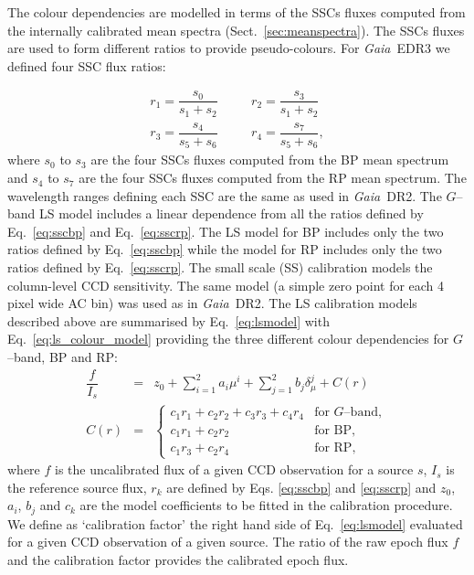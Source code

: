 \documentclass{aa}
\newcommand{\gaia}{\textit{Gaia}\xspace}
\newcommand{\gband}{$G$--band\xspace}
\newcommand{\drt}{\gaia~DR2\xspace}
\newcommand{\edr}{\gaia~EDR3\xspace}
\newcommand{\secname}{Sect.}
\newcommand{\equref}[1]{Eq.~\ref{eq:#1}}
\newcommand{\secref}[1]{\secname~\ref{sec:#1}}
\begin{document}
The colour dependencies are modelled in terms of the SSCs fluxes computed from the internally calibrated mean spectra (\secref{meanspectra}). The SSCs fluxes are used to form different ratios to provide pseudo-colours. For \edr we defined four SSC flux ratios:

\begin{eqnarray}
r_1=\dfrac{s_0}{s_1+s_2}&\quad& r_2=\dfrac{s_3}{s_1+s_2}\label{eq:sscbp}\\
r_3=\dfrac{s_4}{s_5+s_6}&\quad& r_4=\dfrac{s_7}{s_5+s_6},\label{eq:sscrp}
\end{eqnarray}
%
where $s_0$ to $s_3$ are the four SSCs fluxes computed from the BP mean spectrum and $s_4$ to $s_7$ are the four SSCs fluxes computed from the RP mean spectrum. The wavelength ranges defining each SSC are the same as used in \drt \citep[see Table 5 in][]{PhotCore}. The \gband LS model includes a linear dependence from all the ratios defined by \equref{sscbp} and \equref{sscrp}. The LS model for BP includes only the two ratios defined by \equref{sscbp} while the model for RP includes only the two ratios defined by \equref{sscrp}.
The small scale (SS) calibration models the column-level CCD sensitivity. The same model (a simple zero point for each 4 pixel wide AC bin) was used as in \drt. The LS calibration models described above are summarised by \equref{lsmodel} with \equref{ls_colour_model} providing the three different colour dependencies for \gband, BP and RP:
%
\begin{eqnarray}
\dfrac{f}{I_s}&=&z_0+\sum_{i=1}^2{a_i\mu^i}+\sum_{j=1}^2{b_j\delta_{\mu}^j}+C(r)\label{eq:lsmodel}\\
C(r)&=&\left\{
\begin{array}{ll}
     c_1r_1 + c_2r_2+c_3r_3+c_4r_4& \text{for }G\text{--band},\\
     c_1r_1 + c_2r_2& \text{for BP},\\
     c_1r_3 + c_2r_4& \text{for RP},
\end{array}\right.\label{eq:ls_colour_model}
\end{eqnarray}
%
where $f$ is the uncalibrated flux of a given CCD observation for a source $s$, $I_s$ is the reference source flux, $r_k$ are defined by Eqs. \ref{eq:sscbp} and \ref{eq:sscrp} and $z_0$, $a_i$, $b_j$ and $c_k$ are the model coefficients to be fitted in the calibration procedure. We define as `calibration factor' the right hand side of \equref{lsmodel} evaluated for a given CCD observation of a given source. The ratio of the raw epoch flux $f$ and the calibration factor provides the calibrated epoch flux.
\end{document}

